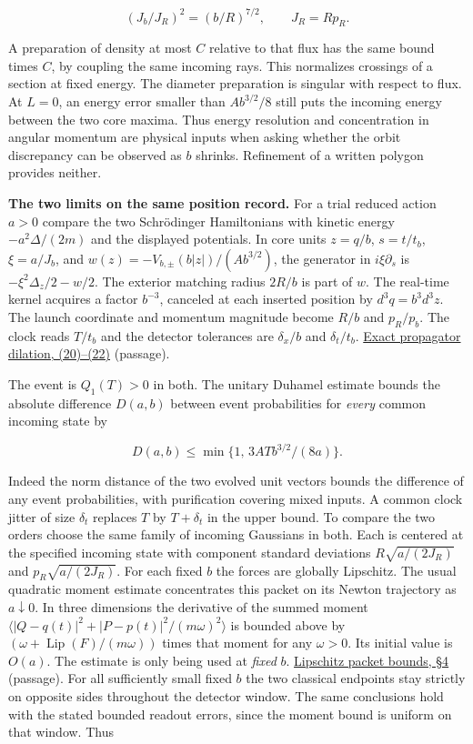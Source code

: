 \documentclass[11pt,a4paper]{article}
\begin{document}
\[
  (J_b/J_R)^2=(b/R)^{7/2},\qquad J_R=Rp_R .
\]

A preparation of density at most \(C\) relative to that flux has the
same bound times \(C\), by coupling the same incoming rays. This
normalizes crossings of a section at fixed energy. The diameter
preparation is singular with respect to flux. At \(L=0\), an energy
error smaller than \(Ab^{3/2}/8\) still puts the incoming energy between
the two core maxima. Thus energy resolution and concentration in angular
momentum are physical inputs when asking whether the orbit discrepancy
can be observed as \(b\) shrinks. Refinement of a written polygon
provides neither.

\textbf{The two limits on the same position record.} For a trial reduced
action \(a>0\) compare the two Schrödinger Hamiltonians with kinetic
energy \(-a^2\Delta/(2m)\) and the displayed potentials. In core units
\(z=q/b\), \(s=t/t_b\), \(\xi=a/J_b\), and
\(w(z)=-V_{b,\pm}(b|z|)/(Ab^{3/2})\), the generator in
\(i\xi\partial_s\) is \(-\xi^2\Delta_z/2-w/2\). The exterior matching
radius \(2R/b\) is part of \(w\). The real-time kernel acquires a factor
\(b^{-3}\), canceled at each inserted position by \(d^3q=b^3d^3z\). The
launch coordinate and momentum magnitude become \(R/b\) and \(p_R/p_b\).
The clock reads \(T/t_b\) and the detector tolerances are \(\delta_x/b\)
and \(\delta_t/t_b\).
\href{groupoid-quantum-newton-states.md\#7-interacting-kernels-under-tangent-scaling}{Exact
propagator dilation, (20)--(22)} (passage).

The event is \(Q_1(T)>0\) in both. The unitary Duhamel estimate bounds
the absolute difference \(D(a,b)\) between event probabilities for
\emph{every} common incoming state by

\[
 D(a,b)\le \min\{1,\,3AT b^{3/2}/(8a)\}.
\]

Indeed the norm distance of the two evolved unit vectors bounds the
difference of any event probabilities, with purification covering mixed
inputs. A common clock jitter of size \(\delta_t\) replaces \(T\) by
\(T+\delta_t\) in the upper bound. To compare the two orders choose the
same family of incoming Gaussians in both. Each is centered at the
specified incoming state with component standard deviations
\(R\sqrt{a/(2J_R)}\) and \(p_R\sqrt{a/(2J_R)}\). For each fixed \(b\)
the forces are globally Lipschitz. The usual quadratic moment estimate
concentrates this packet on its Newton trajectory as \(a\downarrow0\).
In three dimensions the derivative of the summed moment
\(\langle|Q-q(t)|^2+|P-p(t)|^2/(m\omega)^2\rangle\) is bounded above by
\((\omega+\operatorname{Lip}(F)/(m\omega))\) times that moment for any
\(\omega>0\). Its initial value is \(O(a)\). The estimate is only being
used at \emph{fixed} \(b\).
\href{lipschitz-certificate-quantum-lift.md}{Lipschitz packet bounds,
§4} (passage). For all sufficiently small fixed \(b\) the two classical
endpoints stay strictly on opposite sides throughout the detector
window. The same conclusions hold with the stated bounded readout
errors, since the moment bound is uniform on that window. Thus
\end{document}
